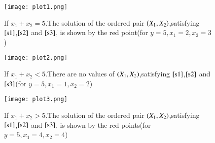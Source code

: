 \documentclass[journal,12pt,twocolumn]{IEEEtran}
\begin{document}
\begin{figure}[!ht]
\centering
\texttt{[image: plot1.png]}
\caption{If $x_1+x_2=5$.The solution of the ordered pair $\left(X_1,X_2\right)$,satisfying $\eqref{s1}$,$\eqref{s2}$ and $\eqref{s3}$, is shown by the red point(for $y=5,x_1=2,x_2=3$)  }
\end{figure}
\begin{figure}[!ht]
\centering
\texttt{[image: plot2.png]}
\caption{If $x_1+x_2<5$.There are no values of $\left(X_1,X_2\right)$,satisfying $\eqref{s1}$,$\eqref{s2}$ and $\eqref{s3}$(for $y=5,x_1=1,x_2=2$)}
\end{figure}\begin{figure}[!ht]
\centering
\texttt{[image: plot3.png]}
\caption{If $x_1+x_2>5$.The solution of the ordered pair $\left(X_1,X_2\right)$,satisfying $\eqref{s1}$,$\eqref{s2}$ and $\eqref{s3}$, is shown by the red points(for $y=5,x_1=4,x_2=4$) }
\end{figure}
\end{document}
